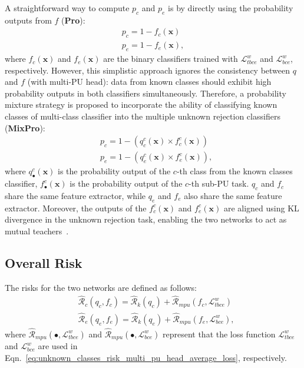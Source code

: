 A straightforward way to compute $p_{c}$ and $p_{e}$ is by directly using the probability outputs from $f$ (\textbf{Pro}):
\begin{equation}
    \begin{aligned}
        p_{c}=1-f_{c}(\boldsymbol{x})\\
        p_{e}=1-f_{e}(\boldsymbol{x}),
    \end{aligned}
    \label{eq:pro}
\end{equation}
where $f_{c}(\boldsymbol{x})$ and $f_{e}(\boldsymbol{x})$ are the binary classifiers trained with $\mathcal{L}_{tbce}^{w}$ and $\mathcal{L}_{bce}^{w}$, respectively. However, this simplistic approach ignores the consistency between $q$ and $f$ (with multi-PU head): data from known classes should exhibit high probability outputs in both classifiers simultaneously. Therefore, a probability mixture strategy is proposed to incorporate the ability of classifying known classes of multi-class classifier into the multiple unknown rejection classifiers (\textbf{MixPro}):
\begin{equation}
    \begin{aligned}
        &p_{c}=1-(q_{c}^{c}(\boldsymbol{x}){\times}f_{c}^{c}(\boldsymbol{x}))\\
        &p_{e}=1-(q_{e}^{c}(\boldsymbol{x}){\times}f_{e}^{c}(\boldsymbol{x})),
    \end{aligned}
    \label{eq:mixpro}
\end{equation}
where $q_{\bullet}^{c}(\boldsymbol{x})$ is the probability output of the $c$-th class from the known classes classifier, $f_{\bullet}^{c}(\boldsymbol{x})$ is the probability output of the $c$-th sub-PU task. $q_{c}$ and $f_{c}$ share the same feature extractor, while $q_{e}$ and $f_{e}$ also share the same feature extractor. Moreover, the outputs of the $f_{c}^{c}(\boldsymbol{x})$ and $f_{e}^{c}(\boldsymbol{x})$ are aligned using KL divergence in the unknown rejection task, enabling the two networks to act as mutual teachers~\cite{T-HOneCls}.

\subsection{Overall Risk}

The risks for the two networks are defined as follows:
\begin{equation}
    \begin{aligned}
        &\hat{\mathcal{R}}_{c}(q_{c},f_{c})=\hat{\mathcal{R}}_{k}(q_{c})+\hat{\mathcal{R}}_{mpu}(f_{c},\mathcal{L}^{w}_{tbce})\\
        &\hat{\mathcal{R}}_{e}(q_{e},f_{e})=\hat{\mathcal{R}}_{k}(q_{e})+\hat{\mathcal{R}}_{mpu}(f_{e},\mathcal{L}^{w}_{bce}),
    \end{aligned}
\end{equation}
where $\hat{\mathcal{R}}_{mpu}(\bullet,\mathcal{L}^{w}_{tbce})$ and $\hat{\mathcal{R}}_{mpu}(\bullet,\mathcal{L}^{w}_{bce})$ represent that the loss function $\mathcal{L}^{w}_{tbce}$ and $\mathcal{L}^{w}_{bce}$ are used in Eqn.~\ref{eq:unknown_classes_risk_multi_pu_head_average_loss}, respectively.

